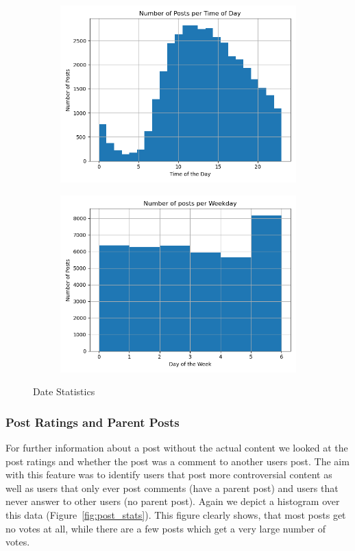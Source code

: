 \documentclass[acmsmall]{acmart}
\begin{document}
\begin{figure}[H]
\centering
\begin{subfigure}{.5\textwidth}
\centering
  \includegraphics[width=.9\linewidth]{assets/Number_of_posts_per_time_of_day.png}
 \end{subfigure}%
\begin{subfigure}{.5\textwidth}
\centering
  \includegraphics[width=.9\linewidth]{assets/Number_of_posts_per_day_of_week.png}
 \end{subfigure}
 \caption{Date Statistics}
\label{fig:date_stats}
\end{figure}

\subsubsection{Post Ratings and Parent Posts}
For further information about a post without the actual content we looked at the post ratings and whether the post was a comment to another users post. The aim with this feature was to identify users that post more controversial content as well as users that only ever post comments (have a parent post) and users that never answer to other users (no parent post). Again we depict a histogram over this data (Figure~\ref{fig:post_stats}). This figure clearly shows, that most posts get no votes at all, while there are a few posts which get a very large number of votes. 
\end{document}
